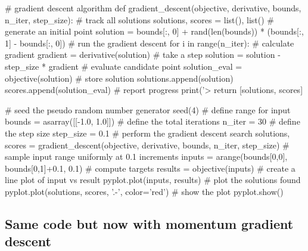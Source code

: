 \documentclass[%
oneside,                 %
final,                   %
10pt]{article}
\begin{document}
# gradient descent algorithm
def gradient_descent(objective, derivative, bounds, n_iter, step_size):
	# track all solutions
	solutions, scores = list(), list()
	# generate an initial point
	solution = bounds[:, 0] + rand(len(bounds)) * (bounds[:, 1] - bounds[:, 0])
	# run the gradient descent
	for i in range(n_iter):
		# calculate gradient
		gradient = derivative(solution)
		# take a step
		solution = solution - step_size * gradient
		# evaluate candidate point
		solution_eval = objective(solution)
		# store solution
		solutions.append(solution)
		scores.append(solution_eval)
		# report progress
		print('>%
	return [solutions, scores]
 
# seed the pseudo random number generator
seed(4)
# define range for input
bounds = asarray([[-1.0, 1.0]])
# define the total iterations
n_iter = 30
# define the step size
step_size = 0.1
# perform the gradient descent search
solutions, scores = gradient_descent(objective, derivative, bounds, n_iter, step_size)
# sample input range uniformly at 0.1 increments
inputs = arange(bounds[0,0], bounds[0,1]+0.1, 0.1)
# compute targets
results = objective(inputs)
# create a line plot of input vs result
pyplot.plot(inputs, results)
# plot the solutions found
pyplot.plot(solutions, scores, '.-', color='red')
# show the plot
pyplot.show()


\epycod


\subsection{Same code but now with momentum gradient descent}
\end{document}
